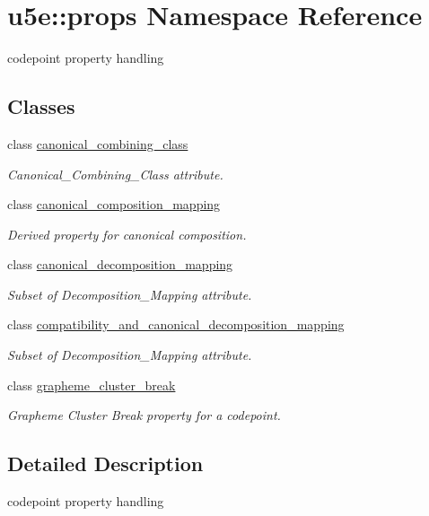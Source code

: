 \hypertarget{namespaceu5e_1_1props}{}\section{u5e\+:\+:props Namespace Reference}
\label{namespaceu5e_1_1props}


codepoint property handling  


\subsection*{Classes}
\begin{DoxyCompactItemize}
\item 
class \hyperlink{classu5e_1_1props_1_1canonical__combining__class}{canonical\+\_\+combining\+\_\+class}
\begin{DoxyCompactList}\small\item\em Canonical\+\_\+\+Combining\+\_\+\+Class attribute. \end{DoxyCompactList}\item 
class \hyperlink{classu5e_1_1props_1_1canonical__composition__mapping}{canonical\+\_\+composition\+\_\+mapping}
\begin{DoxyCompactList}\small\item\em Derived property for canonical composition. \end{DoxyCompactList}\item 
class \hyperlink{classu5e_1_1props_1_1canonical__decomposition__mapping}{canonical\+\_\+decomposition\+\_\+mapping}
\begin{DoxyCompactList}\small\item\em Subset of Decomposition\+\_\+\+Mapping attribute. \end{DoxyCompactList}\item 
class \hyperlink{classu5e_1_1props_1_1compatibility__and__canonical__decomposition__mapping}{compatibility\+\_\+and\+\_\+canonical\+\_\+decomposition\+\_\+mapping}
\begin{DoxyCompactList}\small\item\em Subset of Decomposition\+\_\+\+Mapping attribute. \end{DoxyCompactList}\item 
class \hyperlink{classu5e_1_1props_1_1grapheme__cluster__break}{grapheme\+\_\+cluster\+\_\+break}
\begin{DoxyCompactList}\small\item\em Grapheme Cluster Break property for a codepoint. \end{DoxyCompactList}\end{DoxyCompactItemize}


\subsection{Detailed Description}
codepoint property handling 
